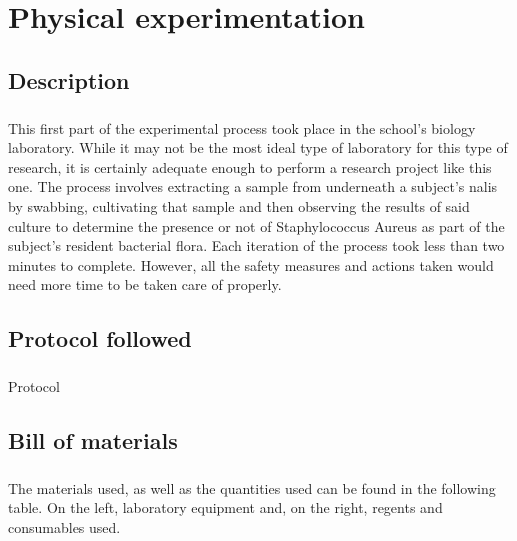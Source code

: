 \chapter{Physical experimentation}
\section{Description}
\paragraph{}This first part of the experimental process took place in the school's biology laboratory. While it may not be the most ideal type of laboratory for this type of research, it is certainly adequate enough to perform a research project like this one. The process involves extracting a sample from underneath a subject's nalis by swabbing, cultivating that sample and then observing the results of said culture to determine the presence or not of Staphylococcus Aureus as part of the subject's resident bacterial flora. Each iteration of the process took less than two minutes to complete. However, all the safety measures and actions taken would need more time to be taken care of properly. 
\section{Protocol followed}
\paragraph{}Protocol
\section{Bill of materials}
\paragraph{}The materials used, as well as the quantities used can be found in the following table. On the left, laboratory equipment and, on the right, regents and consumables used.
